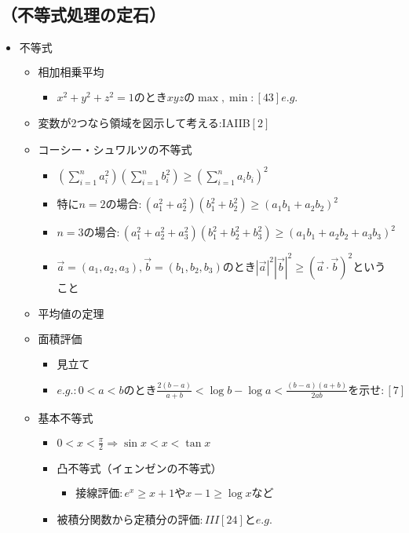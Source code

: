 \documentclass[dvipdfmx,uplatex]{jsarticle}
\begin{document}
\subsection{（不等式処理の定石）}
\begin{itemize}
	\item $ 不等式$
	\begin{itemize}
		\item $ 相加相乗平均$
		\begin{itemize}
			\item $x^2+y^2+z^2=1のときxyzの \max , \min :[43]e.g.$
		\end{itemize}
		\item 変数が2つなら領域を図示して考える:IAIIB$[2]$
		\item $ コーシー・シュワルツの不等式$
		\begin{itemize}
			\item ${\displaystyle \left( \sum_{i=1}^n a_i^2 \right)}{\displaystyle \left( \sum_{i=1}^n b_i^2 \right)}\geq{\displaystyle \left( \sum_{i=1}^n a_ib_i \right)^2}$
			\item $特に n=2 の場合:(a_1^2+a_2^2)(b_1^2+b_2^2)\geq(a_1b_1+a_2b_2)^2$
			\item $n=3 の場合:(a_1^2+a_2^2+a_3^2)(b_1^2+b_2^2+b_3^2)\geq(a_1b_1+a_2b_2+a_3b_3)^2$
			\item $\overrightarrow{a}=(a_1,a_2,a_3), \overrightarrow{b}=(b_1,b_2,b_3)のとき|\overrightarrow{a}|^2|\overrightarrow{b}|^2\geq(\overrightarrow{a}\cdot\overrightarrow{b})^2$ということ
		\end{itemize}
		\item $ 平均値の定理$
		\item $ 面積評価$
		\begin{itemize}
			\item $ 見立て$
			\item $e.g.:0<a<bのとき\frac{2(b-a)}{a+b}< \log b - \log a < \frac{(b-a)(a+b)}{2ab}を示せ:[7]$
		\end{itemize}
		\item $ 基本不等式$
		\begin{itemize}
			\item $ 0 < x < \frac{ \pi }{2} \Rightarrow \sin x < x < \tan x$
			\item $ 凸不等式（イェンゼンの不等式）$
			\begin{itemize}
				\item $ 接線評価:e^x \geq x+1$や$x-1 \geq \log x$など
			\end{itemize}
			\item $ 被積分関数から定積分の評価:III[24]とe.g.$

\end{itemize}
\end{itemize}
\end{itemize}
\end{document}

